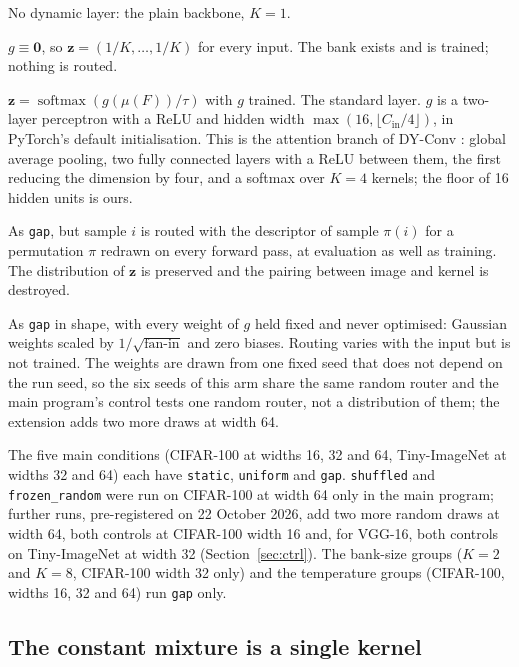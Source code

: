 \documentclass[10pt,a4paper]{article}
\newcommand{\zv}{\mathbf{z}}
\begin{document}
\begin{description}\setlength\itemsep{2pt}
\item[\texttt{static}] No dynamic layer: the plain backbone, $K=1$.
\item[\texttt{uniform}] $g\equiv\mathbf{0}$, so $\zv=(1/K,\dots,1/K)$ for
every input. The bank exists and is trained; nothing is routed.
\item[\texttt{gap}] $\zv=\operatorname{softmax}(g(\mu(F))/\tau)$ with $g$
trained. The standard layer. $g$ is a two-layer perceptron with a ReLU and
hidden width $\max(16,\lfloor C_{\text{in}}/4\rfloor)$, in PyTorch's default
initialisation. This is the attention branch of DY-Conv \citep{chen2020dynamic}:
global average pooling, two fully connected layers with a ReLU between them,
the first reducing the dimension by four, and a softmax over $K=4$ kernels;
the floor of 16 hidden units is ours.
\item[\texttt{shuffled}] As \texttt{gap}, but sample $i$ is routed with
the descriptor of sample $\pi(i)$ for a permutation $\pi$ redrawn on every
forward pass, at evaluation as well as training. The distribution of
$\zv$ is preserved and the pairing between image and kernel is
destroyed.
\item[\texttt{frozen\_random}] As \texttt{gap} in shape, with every weight
of $g$ held fixed and never optimised: Gaussian weights scaled by
$1/\sqrt{\text{fan-in}}$ and zero biases. Routing varies with the input but
is not trained. The weights are drawn from one fixed seed that does not
depend on the run seed, so the six seeds of this arm share the same random
router and the main program's control tests one random router, not a
distribution of them; the extension adds two more draws at width 64.
\end{description}
The five main conditions (CIFAR-100 at widths 16, 32 and 64,
Tiny-ImageNet at widths 32 and 64) each have \texttt{static},
\texttt{uniform} and \texttt{gap}. \texttt{shuffled} and
\texttt{frozen\_random} were run on CIFAR-100 at width 64 only in the main
program;  further runs, pre-registered on 22 October 2026, add two
more random draws at width 64, both controls at CIFAR-100 width 16 and,
for VGG-16, both controls on Tiny-ImageNet at width 32
(Section~\ref{sec:ctrl}). The
bank-size groups ($K=2$ and $K=8$, CIFAR-100 width 32 only) and the
temperature groups (CIFAR-100, widths 16, 32 and 64) run \texttt{gap} only.

\subsection{The constant mixture is a single kernel}
\end{document}
